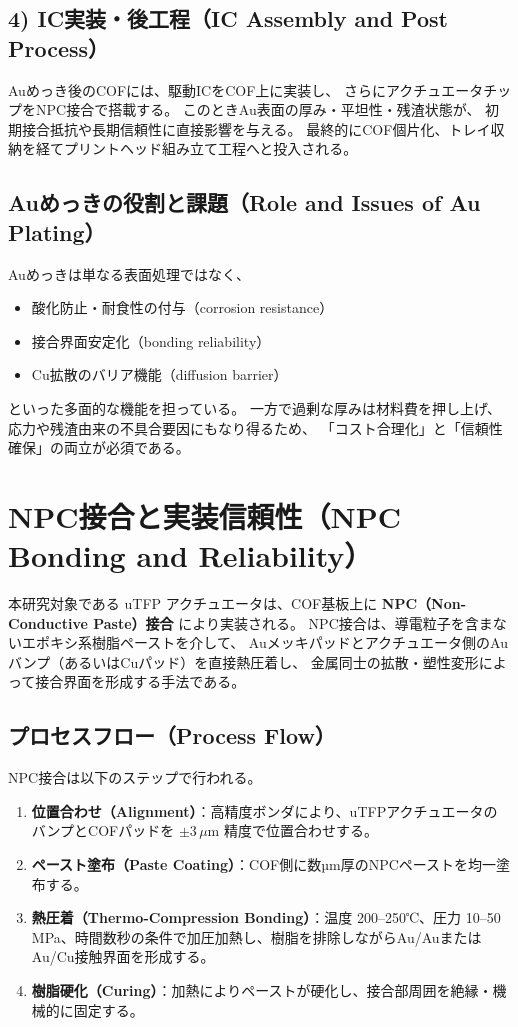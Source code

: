 \documentclass[conference]{IEEEtran}
\begin{document}
\subsection*{4) IC実装・後工程（IC Assembly and Post Process）}
Auめっき後のCOFには、駆動ICをCOF上に実装し、
さらにアクチュエータチップをNPC接合で搭載する。
このときAu表面の厚み・平坦性・残渣状態が、
初期接合抵抗や長期信頼性に直接影響を与える。
最終的にCOF個片化、トレイ収納を経てプリントヘッド組み立て工程へと投入される。

\subsection*{Auめっきの役割と課題（Role and Issues of Au Plating）}
Auめっきは単なる表面処理ではなく、
\begin{itemize}
  \item 酸化防止・耐食性の付与（corrosion resistance）
  \item 接合界面安定化（bonding reliability）
  \item Cu拡散のバリア機能（diffusion barrier）
\end{itemize}
といった多面的な機能を担っている。
一方で過剰な厚みは材料費を押し上げ、応力や残渣由来の不具合要因にもなり得るため、
「コスト合理化」と「信頼性確保」の両立が必須である。

\section{NPC接合と実装信頼性（NPC Bonding and Reliability）}

本研究対象である uTFP アクチュエータは、COF基板上に \textbf{NPC（Non-Conductive Paste）接合} により実装される。
NPC接合は、導電粒子を含まないエポキシ系樹脂ペーストを介して、
Auメッキパッドとアクチュエータ側のAuバンプ（あるいはCuパッド）を直接熱圧着し、
金属同士の拡散・塑性変形によって接合界面を形成する手法である。

\subsection*{プロセスフロー（Process Flow）}
NPC接合は以下のステップで行われる。
\begin{enumerate}
  \item \textbf{位置合わせ（Alignment）}：高精度ボンダにより、uTFPアクチュエータのバンプとCOFパッドを $\pm 3\,\mu$m 精度で位置合わせする。
  \item \textbf{ペースト塗布（Paste Coating）}：COF側に数µm厚のNPCペーストを均一塗布する。
  \item \textbf{熱圧着（Thermo-Compression Bonding）}：温度 200--250℃、圧力 10--50\,MPa、時間数秒の条件で加圧加熱し、樹脂を排除しながらAu/AuまたはAu/Cu接触界面を形成する。
  \item \textbf{樹脂硬化（Curing）}：加熱によりペーストが硬化し、接合部周囲を絶縁・機械的に固定する。
\end{enumerate}
\end{document}
